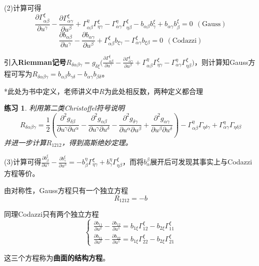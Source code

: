 \documentclass[a4paper,UTF8,fontset=windows]{ctexart}
\newtheorem*{hw}{练习}
\begin{document}
(2)计算可得
$$\frac{\partial\Gamma_{\alpha\beta}^\xi}{\partial u^\gamma}-\frac{\partial\Gamma_{\alpha\gamma}^\xi}{\partial u^\beta}+\Gamma_{\alpha\beta}^\eta\Gamma_{\eta\gamma}^\xi-\Gamma_{\alpha\gamma}^\eta\Gamma_{\eta\beta}^\xi-b_{\alpha\beta}b_\gamma^\xi+b_{\alpha\gamma}b_\beta^\xi=0\ \ (\mathrm{Gauss})$$
$$\frac{\partial b_{\alpha\beta}}{\partial u^\gamma}-\frac{\partial b_{\alpha\gamma}}{\partial u^\beta}+\Gamma_{\alpha\beta}^\xi b_{\xi\gamma}-\Gamma_{\alpha\gamma}^\xi b_{\xi\beta}=0\ \ (\mathrm{Codazzi})$$

引入\textbf{Riemman记号}$R_{\delta\alpha\beta\gamma}=g_{\delta\xi}\big(\frac{\partial\Gamma_{\alpha\beta}^\xi}{\partial u^\gamma}-\frac{\partial\Gamma_{\alpha\gamma}^\xi}{\partial u^\beta}+\Gamma_{\alpha\beta}^\eta\Gamma_{\eta\gamma}^\xi-\Gamma_{\alpha\gamma}^\eta\Gamma_{\eta\beta}^\xi\big)$，则计算知Gauss方程可写为$R_{\delta\alpha\beta\gamma}=b_{\alpha\beta}b_{\gamma\delta}-b_{\alpha\gamma}b_{\beta\delta}$。

*此处为书中定义，老师讲义中$R$为此处相反数，两种定义都合理

\begin{hw}
利用第二类Christoffel符号说明
$$R_{\delta\alpha\beta\gamma}=\frac{1}{2}(\frac{\partial^2g_{\delta\beta}}{\partial u^\gamma\partial u^\alpha}-\frac{\partial^2g_{\alpha\beta}}{\partial u^\gamma\partial u^\delta}-\frac{\partial^2g_{\delta\gamma}}{\partial u^\alpha\partial u^\beta}+\frac{\partial^2g_{\alpha\gamma}}{\partial u^\beta\partial u^\delta})-\Gamma_{\alpha\beta}^\eta\Gamma_{\eta\delta\gamma}+\Gamma_{\alpha\gamma}^\eta\Gamma_{\eta\delta\beta}$$
并进一步计算$R_{1212}$，得到高斯绝妙定理。
\end{hw}

(3)计算可得$\frac{\partial b_\beta^\xi}{\partial u^\gamma}-\frac{\partial b_\gamma^\xi}{\partial u^\beta}=-b_\beta^\eta\Gamma_{\eta\gamma}^\xi+b_\gamma^\eta\Gamma_{\eta\beta}^\xi$，而将$b_\alpha^\beta$展开后可发现其事实上与Codazzi方程等价。

由对称性，Gauss方程只有一个独立方程$$R_{1212}=-b$$

同理Codazzi只有两个独立方程
$$\begin{cases}\frac{\partial b_{11}}{\partial u^2}-\frac{\partial b_{12}}{\partial u^1}=b_{1\xi}\Gamma_{12}^\xi-b_{2\xi}\Gamma_{11}^\xi\\\frac{\partial b_{21}}{\partial u^2}-\frac{\partial b_{22}}{\partial u^1}=b_{1\xi}\Gamma_{22}^\xi-b_{2\xi}\Gamma_{21}^\xi\end{cases}$$

这三个方程称为\textbf{曲面的结构方程}。
\end{document}
